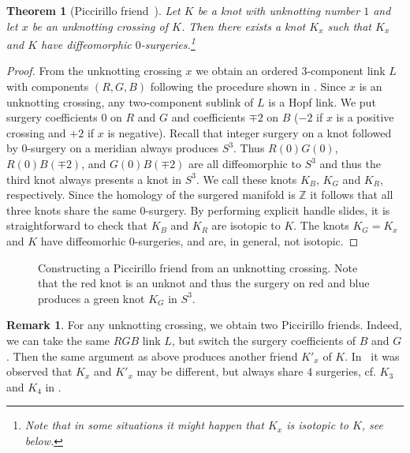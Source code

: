 \documentclass{amsart} %
\newcommand{\Z}{\mathbb{Z}}
\theoremstyle{thm}
\newtheorem{thm}[Theorem]{Theorem}
\theoremstyle{definition}
\newtheorem{rem}[Theorem]{Remark}
\numberwithin{equation}{section}
\begin{document}
\begin{thm} [Piccirillo friend~\cite{Piccirillo_Conway_knot}]\label{thm:Piccirillo}
    Let $K$ be a knot with unknotting number $1$ and let $x$ be an unknotting crossing of $K$. Then there exists a knot $K_x$ such that $K_x$ and $K$ have diffeomorphic $0$-surgeries.\footnote{Note that in some situations it might happen that $K_x$ is isotopic to $K$, see  below.} 
\end{thm}

\begin{proof}
    From the unknotting crossing $x$ we obtain an ordered $3$-component link $L$ with components $(R,G,B)$ following the procedure shown in . Since $x$ is an unknotting crossing, any two-component sublink of $L$ is a Hopf link. We put surgery coefficients $0$ on $R$ and $G$ and coefficients $\mp 2$ on $B$ ($-2$ if $x$ is a positive crossing and $+2$ if $x$ is negative). Recall that integer surgery on a knot followed by $0$-surgery on a meridian always produces $S^3$. Thus $R(0)G(0)$, $R(0)B(\mp2)$, and $G(0)B(\mp2)$ are all diffeomorphic to $S^3$ and thus the third knot always presents a knot in $S^3$. We call these knots $K_B$, $K_G$ and $K_R$, respectively. Since the homology of the surgered manifold is $\Z$ it follows that all three knots share the same $0$-surgery. By performing explicit handle slides, it is straightforward to check that $K_B$ and $K_R$ are isotopic to $K$. The knots $K_G=K_x$ and $K$ have diffeomorhic $0$-surgeries, and are, in general, not isotopic.
\end{proof}

\begin{figure}[htbp] 
	\centering
	\def\svgwidth{0,9\columnwidth}
	
	\caption{Constructing a Piccirillo friend from an unknotting crossing. Note that the red knot is an unknot and thus the surgery on red and blue produces a green knot $K_G$ in $S^3$.}
	\label{fig:RGB}
\end{figure}

\begin{rem}
    For any unknotting crossing, we obtain two Piccirillo friends. Indeed, we can take the same $RGB$ link $L$, but switch the surgery coefficients of $B$ and $G$. Then the same argument as above produces another friend $K'_x$ of $K$. In~\cite{Kegel_Piccirillo} it was observed that $K_x$ and $K'_x$ may be different, but always share $4$ surgeries, cf. $K_3$ and $K_4$ in .
\end{rem}
\end{document}
